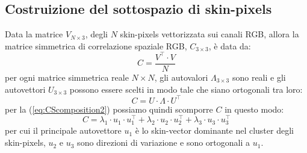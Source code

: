 \documentclass[journal,A4paper,compsoc,epsfig]{IEEEtran}
\begin{document}
    \subsection{Costruizione del sottospazio di skin-pixels}
      Data la matrice $V_{N \times 3}$, degli $N$ skin-pixels vettorizzata sui canali RGB, allora la matrice simmetrica di correlazione spaziale RGB, $C_{3 \times 3}$, è data da:
      \begin{equation}
        C = \frac{V^{\top} \cdot V}{N}
        \label{eq:SCM}
      \end{equation}
      per ogni matrice simmetrica reale $N \times N$, gli autovalori $\Lambda_{3 \times 3}$ sono reali e gli autovettori $U_{3 \times 3}$ possono essere scelti in modo tale che siano ortogonali tra loro:
      \begin{equation}
        C = U \cdot \Lambda \cdot U^{\top}
        \label{eq:CScomposition2}
      \end{equation}
      per la (\ref{eq:CScomposition2}) possiamo quindi scomporre $C$ in questo modo:
      \begin{equation}
        C =
          \lambda_1 \cdot u_1 \cdot u^{\top}_1 +
          \lambda_2 \cdot u_2 \cdot u^{\top}_2 +
          \lambda_3 \cdot u_3 \cdot u^{\top}_3
        \label{eq:CScomposition3}
      \end{equation}
      per cui il principale autovettore $u_1$ è lo skin-vector dominante nel cluster degli skin-pixels, $u_2$ e $u_3$ sono direzioni di variazione e sono ortogonali a $u_1$.
\end{document}
